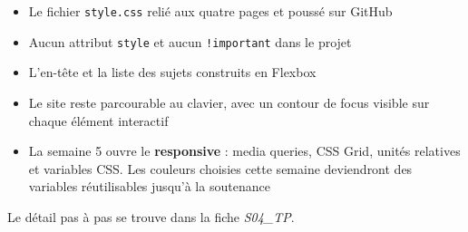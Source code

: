 \documentclass[a4paper,11pt]{article}
\begin{document}
\vspace{8pt}
\begin{tcolorbox}[attention, title={Pour la semaine 5}]
\begin{itemize}
  \item Le fichier \texttt{style.css} relié aux quatre pages et poussé sur GitHub
  \item Aucun attribut \texttt{style} et aucun \texttt{!important} dans le projet
  \item L'en-tête et la liste des sujets construits en Flexbox
  \item Le site reste parcourable au clavier, avec un contour de focus visible sur chaque élément interactif
  \item La semaine 5 ouvre le \textbf{responsive} : media queries, CSS Grid, unités relatives et variables CSS. Les couleurs choisies cette semaine deviendront des variables réutilisables jusqu'à la soutenance
\end{itemize}
Le détail pas à pas se trouve dans la fiche \textit{S04\_TP}.
\end{tcolorbox}
\end{document}
